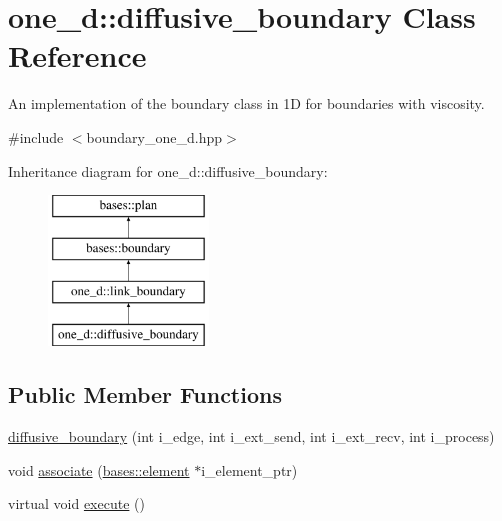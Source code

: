 \hypertarget{classone__d_1_1diffusive__boundary}{\section{one\-\_\-d\-:\-:diffusive\-\_\-boundary Class Reference}
\label{classone__d_1_1diffusive__boundary}
}


An implementation of the boundary class in 1\-D for boundaries with viscosity.  




{\ttfamily \#include $<$boundary\-\_\-one\-\_\-d.\-hpp$>$}

Inheritance diagram for one\-\_\-d\-:\-:diffusive\-\_\-boundary\-:\begin{figure}[H]
\begin{center}
\leavevmode
\includegraphics[height=4.000000cm]{classone__d_1_1diffusive__boundary}
\end{center}
\end{figure}
\subsection*{Public Member Functions}
\begin{DoxyCompactItemize}
\item 
\hyperlink{classone__d_1_1diffusive__boundary_ad402530bee0063e6cb05ceaa506c5706}{diffusive\-\_\-boundary} (int i\-\_\-edge, int i\-\_\-ext\-\_\-send, int i\-\_\-ext\-\_\-recv, int i\-\_\-process)
\begin{DoxyCompactList}\small\item\em \end{DoxyCompactList}\item 
void \hyperlink{classone__d_1_1diffusive__boundary_ae8b851282284945b7e6e9373a0edb4a3}{associate} (\hyperlink{classbases_1_1element}{bases\-::element} $\ast$i\-\_\-element\-\_\-ptr)
\begin{DoxyCompactList}\small\item\em \end{DoxyCompactList}\item 
virtual void \hyperlink{classone__d_1_1diffusive__boundary_a2a841c3e9b57d10fc28d41e325b8452c}{execute} ()
\begin{DoxyCompactList}\small\item\em \end{DoxyCompactList}\end{DoxyCompactItemize}
